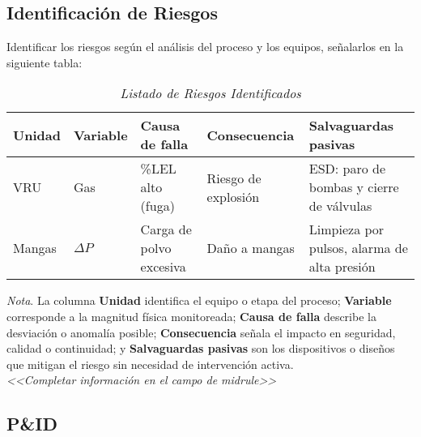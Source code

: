 \documentclass[12pt,letterpaper]{report}
\begin{document}
	\subsection{Identificación de Riesgos}
	Identificar los riesgos según el análisis del proceso y los equipos, señalarlos en la siguiente tabla:
	\begin{table}[ht]
		\captionsetup{justification=raggedright,singlelinecheck=false}
		\caption{\textit{Listado de Riesgos Identificados}}
		\label{tab:riesgos} %
		\centering
		\begin{tabular}{lllll}
			\toprule
			\textbf{Unidad} & \textbf{Variable} & \textbf{Causa de falla} & \textbf{Consecuencia} & \textbf{Salvaguardas pasivas} \\
			\midrule
			VRU & Gas & \%LEL alto (fuga) & Riesgo de explosión & ESD: paro de bombas y cierre de válvulas \\
			Mangas & $\Delta P$ & Carga de polvo excesiva & Daño a mangas & Limpieza por pulsos, alarma de alta presión \\
			\bottomrule
		\end{tabular}
		
		\begin{flushleft}
			\textit{Nota}. 
			La columna \textbf{Unidad} identifica el equipo o etapa del proceso; 
			\textbf{Variable} corresponde a la magnitud física monitoreada; 
			\textbf{Causa de falla} describe la desviación o anomalía posible; 
			\textbf{Consecuencia} señala el impacto en seguridad, calidad o continuidad; 
			y \textbf{Salvaguardas pasivas} son los dispositivos o diseños que mitigan el riesgo sin necesidad de intervención activa. \\
			\textit{<<Completar información en el campo de midrule>>}
		\end{flushleft}
	\end{table}
	
	\newpage
	\begin{center}
		\section{P\&ID}
	\end{center}
\end{document}

